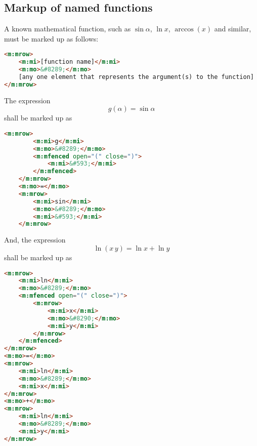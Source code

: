 \documentclass[english,a4paper,11pt]{article}
\begin{document}
\subsection{Markup of named functions}\label{named-functions}
A known mathematical function, such as $\sin \alpha$, $\ln x$, $\arccos(x)$ and similar, must be marked up as follows:
\begin{lstlisting}[language=HTML]
<m:mrow>
	<m:mi>[function name]</m:mi>
	<m:mo>&#8289;</m:mo>
	[any one element that represents the argument(s) to the function]
</m:mrow>
\end{lstlisting}


\begin{examples}
	The expression 
	\begin{equation}g(\alpha) = \sin \alpha\end{equation}
	shall be marked up as
	\begin{lstlisting}[language=HTML]
	<m:mrow>
		<m:mi>g</m:mi>
		<m:mo>&#8289;</m:mo>
		<m:mfenced open="(" close=")">
			<m:mi>&#593;</m:mi>
		</m:mfenced>
	</m:mrow>
	<m:mo>=</m:mo>
	<m:mrow>
		<m:mi>sin</m:mi>
		<m:mo>&#8289;</m:mo>
		<m:mi>&#593;</m:mi>
	</m:mrow>
	\end{lstlisting}

And, the expression 
\begin{equation}
\ln (x\, y) = \ln x + \ln y
\end{equation}
shall be marked up as
\begin{lstlisting}[language=HTML]
<m:mrow>
	<m:mi>ln</m:mi>
	<m:mo>&#8289;</m:mo>
	<m:mfenced open="(" close=")">
		<m:mrow>
			<m:mi>x</m:mi>
			<m:mo>&#8290;</m:mo>
			<m:mi>y</m:mi>
		</m:mrow>
	</m:mfenced>
</m:mrow>
<m:mo>=</m:mo>
<m:mrow>
	<m:mi>ln</m:mi>
	<m:mo>&#8289;</m:mo>
	<m:mi>x</m:mi>
</m:mrow>
<m:mo>+</m:mo>
<m:mrow>
	<m:mi>ln</m:mi>
	<m:mo>&#8289;</m:mo>
	<m:mi>y</m:mi>
</m:mrow>
\end{lstlisting}
\end{examples}
\end{document}
